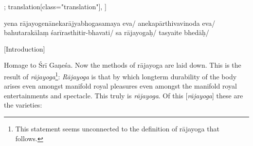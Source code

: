 \documentclass[12pt]{article}%
\begin{document}
\begin{alignment}[
    texts=edition[class="edition"];
    translation[class="translation"],
    ]
\begin{edition}
\begin{prose}
      yena rājayogenānekarājyabhogasamaya eva/ anekapārthivavinoda
      eva/ bahutarakālaṃ śarīrasthitir-bhavati/ sa
      rājayogaḥ/ \bigskip
       tasyaite bhedāḥ/
     \end{prose}
     \end{edition}
      \begin{translation}
    \centerline{\textrm{\small{[Introduction]}}}
    \bigskip
    \begin{tlate}Homage to Śrī Gaṇeśa. Now the methods of rājayoga are laid down. This is the result of \textit{rājayoga}\footnote{This statement seems unconnected to the definition of rājayoga that follows.}: \textit{Rājayoga} is that by which longterm durability of the body arises even amongst manifold royal pleasures even amongst the manifold royal entertainments and spectacle. This truly is \textit{rājayoga}. Of this [\textit{rājayoga}] these are the varieties: \end{tlate}
      \bigskip
       \end{translation}
        

\end{alignment}
\end{document}
